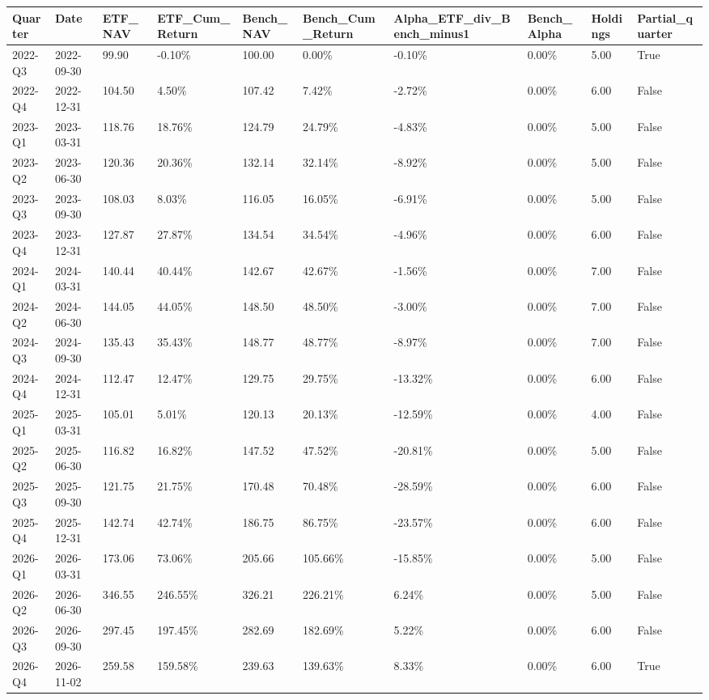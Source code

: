 \begin{longtable}{llllllllll}
Quarter & Date & ETF\_NAV & ETF\_Cum\_Return & Bench\_NAV & Bench\_Cum\_Return & Alpha\_ETF\_div\_Bench\_minus1 & Bench\_Alpha & Holdings & Partial\_quarter \\
\hline
2022-Q3 & 2022-09-30 & 99.90 & -0.10\% & 100.00 & 0.00\% & -0.10\% & 0.00\% & 5.00 & True \\
2022-Q4 & 2022-12-31 & 104.50 & 4.50\% & 107.42 & 7.42\% & -2.72\% & 0.00\% & 6.00 & False \\
2023-Q1 & 2023-03-31 & 118.76 & 18.76\% & 124.79 & 24.79\% & -4.83\% & 0.00\% & 5.00 & False \\
2023-Q2 & 2023-06-30 & 120.36 & 20.36\% & 132.14 & 32.14\% & -8.92\% & 0.00\% & 5.00 & False \\
2023-Q3 & 2023-09-30 & 108.03 & 8.03\% & 116.05 & 16.05\% & -6.91\% & 0.00\% & 5.00 & False \\
2023-Q4 & 2023-12-31 & 127.87 & 27.87\% & 134.54 & 34.54\% & -4.96\% & 0.00\% & 6.00 & False \\
2024-Q1 & 2024-03-31 & 140.44 & 40.44\% & 142.67 & 42.67\% & -1.56\% & 0.00\% & 7.00 & False \\
2024-Q2 & 2024-06-30 & 144.05 & 44.05\% & 148.50 & 48.50\% & -3.00\% & 0.00\% & 7.00 & False \\
2024-Q3 & 2024-09-30 & 135.43 & 35.43\% & 148.77 & 48.77\% & -8.97\% & 0.00\% & 7.00 & False \\
2024-Q4 & 2024-12-31 & 112.47 & 12.47\% & 129.75 & 29.75\% & -13.32\% & 0.00\% & 6.00 & False \\
2025-Q1 & 2025-03-31 & 105.01 & 5.01\% & 120.13 & 20.13\% & -12.59\% & 0.00\% & 4.00 & False \\
2025-Q2 & 2025-06-30 & 116.82 & 16.82\% & 147.52 & 47.52\% & -20.81\% & 0.00\% & 5.00 & False \\
2025-Q3 & 2025-09-30 & 121.75 & 21.75\% & 170.48 & 70.48\% & -28.59\% & 0.00\% & 6.00 & False \\
2025-Q4 & 2025-12-31 & 142.74 & 42.74\% & 186.75 & 86.75\% & -23.57\% & 0.00\% & 6.00 & False \\
2026-Q1 & 2026-03-31 & 173.06 & 73.06\% & 205.66 & 105.66\% & -15.85\% & 0.00\% & 5.00 & False \\
2026-Q2 & 2026-06-30 & 346.55 & 246.55\% & 326.21 & 226.21\% & 6.24\% & 0.00\% & 5.00 & False \\
2026-Q3 & 2026-09-30 & 297.45 & 197.45\% & 282.69 & 182.69\% & 5.22\% & 0.00\% & 6.00 & False \\
2026-Q4 & 2026-11-02 & 259.58 & 159.58\% & 239.63 & 139.63\% & 8.33\% & 0.00\% & 6.00 & True \\
\end{longtable}
